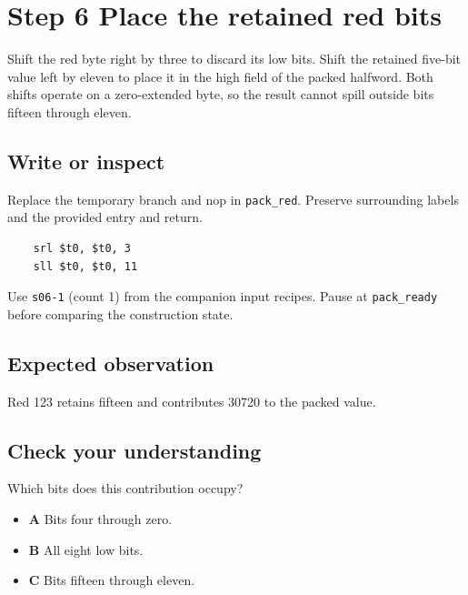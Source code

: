\section{Step 6 Place the retained red bits}\label{rgb-s06}

Shift the red byte right by three to discard its low bits. Shift the retained five-bit value left by eleven to place it in the high field of the packed halfword. Both shifts operate on a zero-extended byte, so the result cannot spill outside bits fifteen through eleven.

\subsection{Write or inspect}
Replace the temporary branch and nop in \texttt{pack\_red}. Preserve surrounding labels and the provided entry and return.

\begin{verbatim}
    srl $t0, $t0, 3
    sll $t0, $t0, 11
\end{verbatim}
Use \texttt{s06-1} (count 1) from the companion input recipes. Pause at \texttt{pack\_ready} before comparing the construction state.

\subsection{Expected observation}
Red 123 retains fifteen and contributes 30720 to the packed value.

\subsection{Check your understanding}
Which bits does this contribution occupy?

\begin{itemize}
  \item \textbf{A} Bits four through zero.
  \item \textbf{B} All eight low bits.
  \item \textbf{C} Bits fifteen through eleven.
\end{itemize}
